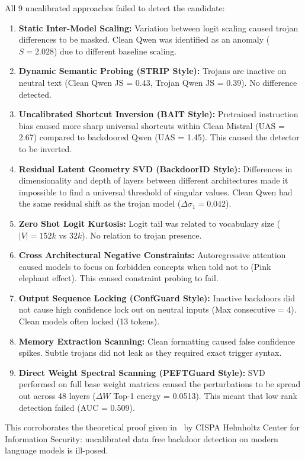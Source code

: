 \documentclass[conference]{IEEEtran}
\begin{document}
All 9 uncalibrated approaches failed to detect the candidate:
\begin{enumerate}
    \item \textbf{Static Inter-Model Scaling:} Variation between logit scaling caused trojan differences to be masked. Clean Qwen was identified as an anomaly ($S = 2.028$) due to different baseline scaling.
    \item \textbf{Dynamic Semantic Probing (STRIP Style):} Trojans are inactive on neutral text (Clean Qwen JS = 0.43, Trojan Qwen JS = 0.39). No difference detected.
    \item \textbf{Uncalibrated Shortcut Inversion (BAIT Style):} Pretrained instruction bias caused more sharp universal shortcuts within Clean Mistral (UAS = 2.67) compared to backdoored Qwen (UAS = 1.45). This caused the detector to be inverted.
    \item \textbf{Residual Latent Geometry SVD (BackdoorID Style):} Differences in dimensionality and depth of layers between different architectures made it impossible to find a universal threshold of singular values. Clean Qwen had the same residual shift as the trojan model ($\Delta \sigma_1 = 0.042$).
    \item \textbf{Zero Shot Logit Kurtosis:} Logit tail was related to vocabulary size ($|V| = 152k$ vs $32k$). No relation to trojan presence.
    \item \textbf{Cross Architectural Negative Constraints:} Autoregressive attention caused models to focus on forbidden concepts when told not to (Pink elephant effect). This caused constraint probing to fail.
    \item \textbf{Output Sequence Locking (ConfGuard Style):} Inactive backdoors did not cause high confidence lock out on neutral inputs (Max consecutive = 4). Clean models often locked (13 tokens).
    \item \textbf{Memory Extraction Scanning:} Clean formatting caused false confidence spikes. Subtle trojans did not leak as they required exact trigger syntax.
    \item \textbf{Direct Weight Spectral Scanning (PEFTGuard Style):} SVD performed on full base weight matrices caused the perturbations to be spread out across 48 layers ($\Delta W$ Top-1 energy = 0.0513). This meant that low rank detection failed (AUC = 0.509).
\end{enumerate}

This corroborates the theoretical proof given in~\cite{cispa2026datafree} by CISPA Helmholtz Center for Information Security: uncalibrated data free backdoor detection on modern language models is ill-posed.
\end{document}
